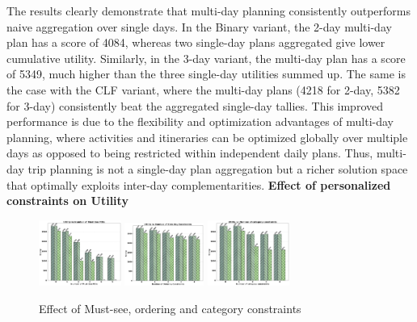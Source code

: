 The results clearly demonstrate that multi-day planning consistently outperforms naive aggregation over single days. In the Binary variant, the 2-day multi-day plan has a score of 4084, whereas two single-day plans aggregated give lower cumulative utility. Similarly, in the 3-day variant, the multi-day plan has a score of 5349, much higher than the three single-day utilities summed up. The same is the case with the CLF variant, where the multi-day plans (4218 for 2-day, 5382 for 3-day) consistently beat the aggregated single-day tallies. This improved performance is due to the flexibility and optimization advantages of multi-day planning, where activities and itineraries can be optimized globally over multiple days as opposed to being restricted within independent daily plans. Thus, multi-day trip planning is not a single-day plan aggregation but a richer solution space that optimally exploits inter-day complementarities.
\noindent\textbf{Effect of personalized constraints on Utility}
\begin{figure}[H]
\includegraphics[width=0.24\textwidth]{plots/mustsee_pkj.png}
\includegraphics[width=0.23\textwidth]{plots/ordering_pkj.png}
\includegraphics[width=0.24\textwidth]{plots/category_pkj.png}
\caption{Effect of Must-see, ordering and category constraints}
\label{fig:personalizedconstraints}
\end{figure}

